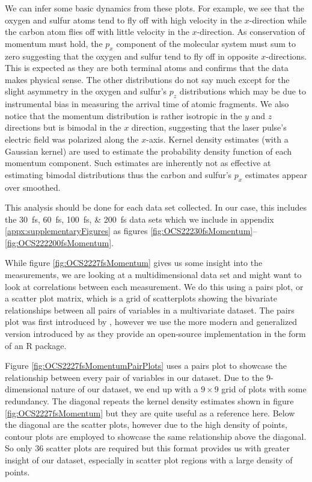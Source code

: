 We can infer some basic dynamics from these plots. For example, we see that the oxygen and sulfur atoms tend to fly off with high velocity in the $x$-direction while the carbon atom flies off with little velocity in the $x$-direction. As conservation of momentum must hold, the $p_x$ component of the molecular system must sum to zero suggesting that the oxygen and sulfur tend to fly off in opposite $x$-directions. This is expected as they are both terminal atoms and confirms that the data makes physical sense. The other distributions do not say much except for the slight asymmetry in the oxygen and sulfur's $p_z$ distributions which may be due to instrumental bias in measuring the arrival time of atomic fragments. We also notice that the momentum distribution is rather isotropic in the $y$ and $z$ directions but is bimodal in the $x$ direction, suggesting that the laser pulse's electric field was polarized along the $x$-axis. Kernel density estimates (with a Gaussian kernel) are used to estimate the probability density function of each momentum component. Such estimates are inherently not as effective at estimating bimodal distributions thus the carbon and sulfur's $p_x$ estimates appear over smoothed.

This analysis should be done for each data set collected. In our case, this includes the \SIlist{30;60;100;200}{\fs} data sets which we include in appendix \ref{appx:supplementaryFigures} as figures \ref{fig:OCS22230fsMomentum}--\ref{fig:OCS222200fsMomentum}.

While figure \ref{fig:OCS2227fsMomentum} gives us some insight into the measurements, we are looking at a multidimensional data set and might want to look at correlations between each measurement. We do this using a pairs plot, or a scatter plot matrix, which is a grid of scatterplots showing the bivariate relationships between all pairs of variables in a multivariate dataset. The pairs plot was first introduced by \citet{Hartigan75}, however we use the more modern and generalized version introduced by \citet{Emerson13} as they provide an open-source implementation in the form of an R package.

Figure \ref{fig:OCS2227fsMomentumPairPlots} uses a pairs plot to showcase the relationship between every pair of variables in our dataset. Due to the $9$-dimensional nature of our dataset, we end up with a $9\times9$ grid of plots with some redundancy. The diagonal repeats the kernel density estimates shown in figure \ref{fig:OCS2227fsMomentum} but they are quite useful as a reference here. Below the diagonal are the scatter plots, however due to the high density of points, contour plots are employed to showcase the same relationship above the diagonal. So only 36 scatter plots are required but this format provides us with greater insight of our dataset, especially in scatter plot regions with a large density of points.


